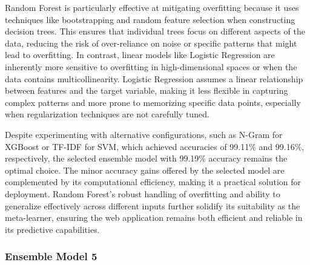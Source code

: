 \vspace{1em}

\noindent
Random Forest is particularly effective at mitigating overfitting because it uses techniques like bootstrapping and random feature selection when constructing decision trees. This ensures that individual trees focus on different aspects of the data, reducing the risk of over-reliance on noise or specific patterns that might lead to overfitting. In contrast, linear models like Logistic Regression are inherently more sensitive to overfitting in high-dimensional spaces or when the data contains multicollinearity. Logistic Regression assumes a linear relationship between features and the target variable, making it less flexible in capturing complex patterns and more prone to memorizing specific data points, especially when regularization techniques are not carefully tuned.

\vspace{1em}

\noindent
Despite experimenting with alternative configurations, such as N-Gram for XGBoost or TF-IDF for SVM, which achieved accuracies of 99.11\% and 99.16\%, respectively, the selected ensemble model with 99.19\% accuracy remains the optimal choice. The minor accuracy gains offered by the selected model are complemented by its computational efficiency, making it a practical solution for deployment. Random Forest’s robust handling of overfitting and ability to generalize effectively across different inputs further solidify its suitability as the meta-learner, ensuring the web application remains both efficient and reliable in its predictive capabilities.

\pagebreak

\subsubsection{Ensemble Model 5}

